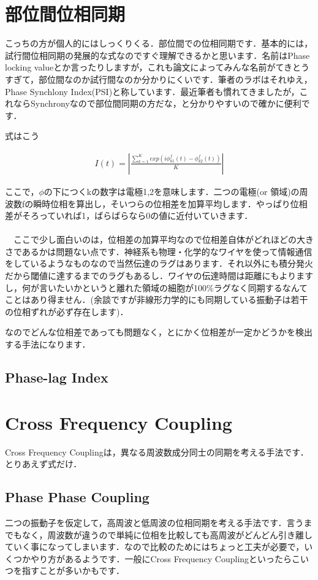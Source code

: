 \documentclass[11pt,a4paper]{ujreport} 	%
\begin{document}
\section{部位間位相同期}
こっちの方が個人的にはしっくりくる．部位間での位相同期です．基本的には，試行間位相同期の発展的な式なのですぐ理解できるかと思います．名前はPhase locking valueとか言ったりしますが，これも論文によってみんな名前がてきとうすぎて，部位間なのか試行間なのか分かりにくいです．筆者のラボはそれゆえ，Phase Synchlony Index(PSI)と称しています．最近筆者も慣れてきましたが，これならSynchronyなので部位間同期の方だな，と分かりやすいので確かに便利です．

式はこう

\begin{eqnarray}
  \label{eq:psi}
  I(t) = |\frac{\sum_{k=1}^K exp(i \phi_{k1}^f(t) -\phi_{k2}^f(t)  )}{K}|
\end{eqnarray}

ここで，$\phi$の下につくkの数字は電極1,2を意味します．二つの電極(or 領域)の周波数fの瞬時位相を算出し，そいつらの位相差を加算平均します．やっぱり位相差がそろっていれば1，ばらばらなら0の値に近付いていきます．\\
\\
　ここで少し面白いのは，位相差の加算平均なので位相差自体がどれほどの大きさであるかは問題ない点です．神経系も物理・化学的なワイヤを使って情報通信をしているようなものなので当然伝達のラグはあります．それ以外にも積分発火だから閾値に達するまでのラグもあるし．ワイヤの伝達時間は距離にもよりますし，何が言いたいかというと離れた領域の細胞が100\%ラグなく同期するなんてことはあり得ません．(余談ですが非線形力学的にも同期している振動子は若干の位相ずれが必ず存在します)．

なのでどんな位相差であっても問題なく，とにかく位相差が一定かどうかを検出する手法になります．

\subsection{Phase-lag Index}

\section{Cross Frequency Coupling}
Cross Frequency Couplingは，異なる周波数成分同士の同期を考える手法です．とりあえず式だけ．
\subsection{Phase Phase Coupling}
二つの振動子を仮定して，高周波と低周波の位相同期を考える手法です．言うまでもなく，周波数が違うので単純に位相を比較しても高周波がどんどん引き離していく事になってしまいます．なので比較のためにはちょっと工夫が必要で，いくつかやり方があるようです．一般にCross Frequency Couplingといったらこいつを指すことが多いかもです．
\end{document}

